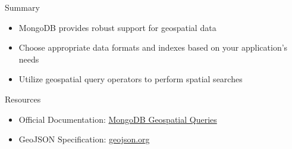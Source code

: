 \documentclass{beamer}
\begin{document}

\begin{frame}{Summary}
  \begin{itemize}
    \item MongoDB provides robust support for geospatial data
    \item Choose appropriate data formats and indexes based on your application's needs
    \item Utilize geospatial query operators to perform spatial searches
  \end{itemize}
\end{frame}

\begin{frame}{Resources}
  \begin{itemize}
    \item Official Documentation: \href{https://www.mongodb.com/docs/manual/geospatial-queries/}{MongoDB Geospatial Queries}
    \item GeoJSON Specification: \href{https://geojson.org/}{geojson.org}
  \end{itemize}
\end{frame}
\end{document}
